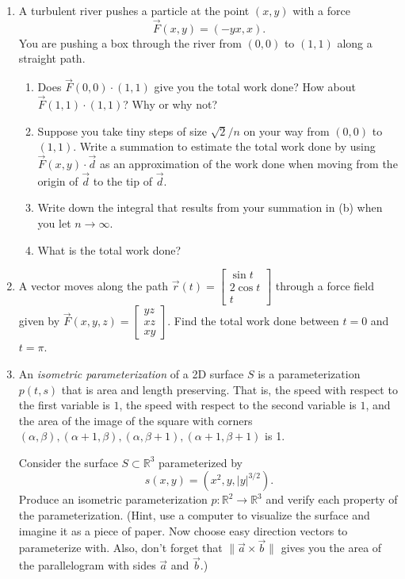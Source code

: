 \documentclass[letter]{article}
\newcommand{\R}{\mathbb{R}}
\newcommand{\mat}[1]{\begin{bmatrix}#1\end{bmatrix}}
\begin{document}
	\begin{enumerate}[resume]
		\item A turbulent river pushes a particle at the point $(x,y)$ with a force
			\[
				\vec F(x,y) = (-yx,x).
			\]
			You are pushing a box through the river from $(0,0)$ to $(1,1)$ along a 
			straight path.
			\begin{enumerate}
				\item Does $\vec F(0,0)\cdot (1,1)$ give you the total work done?
					How about $\vec F(1,1)\cdot (1,1)$?  Why or why not?
				\item Suppose you take tiny steps of size $\sqrt{2}/n$ on your way
					from $(0,0)$ to $(1,1)$.  Write a summation to estimate
					the total work done by using $\vec F(x,y)\cdot \vec d$ as
					an approximation of the work done when
					moving from the origin of $\vec d$
					to the tip of $\vec d$.
				\item Write down the integral that results from your summation in
					(b) when you let $n\to \infty$.
				\item What is the total work done?
			\end{enumerate}
		
		\item A vector moves along the path $\vec r(t) = \mat{\sin t\\ 2\cos t\\ t}$ through a force field given by
			$\vec F(x,y,z)=\mat{yz\\ xz\\ xy}$.  Find the total work done between $t=0$ and $t=\pi$.

		\item An \emph{isometric parameterization} of a 2D surface $S$ is a parameterization $p(t,s)$
			that is area and length preserving.  That is, the speed with respect to the first variable
			is $1$, the speed with respect to the second variable is $1$, and the area of the image
			of the square with corners $(\alpha,\beta),(\alpha+1,\beta),(\alpha,\beta+1),(\alpha+1,\beta+1)$ is 1.

			Consider the surface $S\subset \R^3$ parameterized by \[
				s(x,y) = (x^2,y, |y|^{3/2}).
			\]
			Produce an isometric parameterization $p:\R^2\to\R^3$ and verify each 
			property of the parameterization. (Hint, use a computer to visualize the surface
			and imagine it as a piece of paper.  Now choose easy direction vectors to 
			parameterize with.  Also, don't forget that $\|\vec a\times \vec b\|$ gives you
			the area of the parallelogram with sides $\vec a$ and $\vec b$.)
	\end{enumerate}
\end{document}
